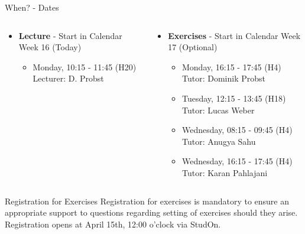 \begin{frame}{When? - Dates}
	\begin{columns}
		\begin{column}{0.5\textwidth}
			\begin{itemize}
				\item \textbf{Lecture} - Start in Calendar Week 16 (Today)
				      \begin{itemize}
					      \item Monday, 10:15 - 11:45 (H20) \\
					            {\color{gray}Lecturer: D. Probst}
				      \end{itemize}
			\end{itemize}
		\end{column}

		\begin{column}{0.5\textwidth}
			\begin{itemize}
				\item \textbf{Exercises} - Start in Calendar Week 17 (Optional)
				      \begin{itemize}
					      \item Monday, 16:15 - 17:45 (H4) \\
					            {\color{gray}Tutor: Dominik Probst}
					      \item Tuesday, 12:15 - 13:45 (H18) \\
					            {\color{gray}Tutor: Lucas Weber}
					      \item Wednesday, 08:15 - 09:45 (H4) \\
					            {\color{gray}Tutor: Anugya Sahu}
					      \item Wednesday, 16:15 - 17:45 (H4) \\
					            {\color{gray}Tutor: Karan Pahlajani}
				      \end{itemize}
			\end{itemize}
		\end{column}
	\end{columns}

	\begin{block}{Registration for Exercises}
		Registration for exercises is mandatory to ensure an appropriate support to questions regarding setting of exercises should they arise.
			{\color{faured}Registration opens at April 15th, 12:00 o'clock via StudOn.}
	\end{block}
\end{frame}

